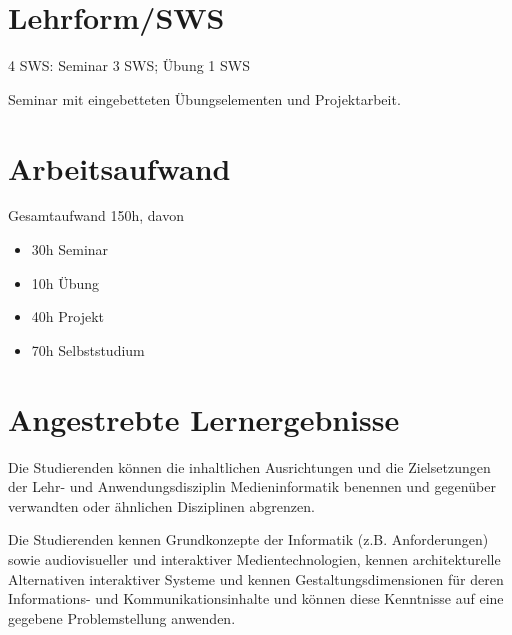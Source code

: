\hypertarget{lehrformswspathlabelmi-2017modulbeschreibungen-bachelorba_einfhrungindiemedieninformatik}{%
\section*{Lehrform/SWS\label{/mi-2017/modulbeschreibungen-bachelor/BA_EinfhrungindieMedieninformatik}}\label{lehrformswspathlabelmi-2017modulbeschreibungen-bachelorba_einfhrungindiemedieninformatik}}

4 SWS: Seminar 3 SWS; Übung 1 SWS

Seminar mit eingebetteten Übungselementen und Projektarbeit.

\hypertarget{arbeitsaufwandpathlabelmi-2017modulbeschreibungen-bachelorba_einfhrungindiemedieninformatik}{%
\section*{Arbeitsaufwand\label{/mi-2017/modulbeschreibungen-bachelor/BA_EinfhrungindieMedieninformatik}}\label{arbeitsaufwandpathlabelmi-2017modulbeschreibungen-bachelorba_einfhrungindiemedieninformatik}}

Gesamtaufwand 150h, davon

\begin{itemize}
\tightlist
\item
  30h Seminar
\item
  10h Übung
\item
  40h Projekt
\item
  70h Selbststudium
\end{itemize}

\hypertarget{angestrebte-lernergebnissepathlabelmi-2017modulbeschreibungen-bachelorba_einfhrungindiemedieninformatik}{%
\section*{Angestrebte
Lernergebnisse\label{/mi-2017/modulbeschreibungen-bachelor/BA_EinfhrungindieMedieninformatik}}\label{angestrebte-lernergebnissepathlabelmi-2017modulbeschreibungen-bachelorba_einfhrungindiemedieninformatik}}

Die Studierenden können die inhaltlichen Ausrichtungen und die
Zielsetzungen der Lehr- und Anwendungsdisziplin Medieninformatik
benennen und gegenüber verwandten oder ähnlichen Disziplinen abgrenzen.

Die Studierenden kennen Grundkonzepte der Informatik (z.B.
Anforderungen) sowie audiovisueller und interaktiver Medientechnologien,
kennen architekturelle Alternativen interaktiver Systeme und kennen
Gestaltungsdimensionen für deren Informations- und Kommunikationsinhalte
und können diese Kenntnisse auf eine gegebene Problemstellung anwenden.

